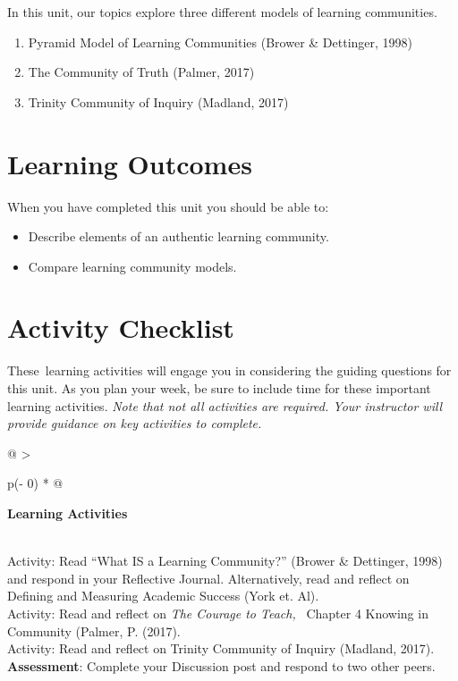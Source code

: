 \documentclass[
]{book}
\providecommand{\tightlist}{%
  \setlength{\itemsep}{0pt}\setlength{\parskip}{0pt}}
\begin{document}
In this unit, our topics explore three different models of learning communities.

\begin{enumerate}
\def\labelenumi{\arabic{enumi}.}
\tightlist
\item
  Pyramid Model of Learning Communities (Brower \& Dettinger, 1998)
\item
  The Community of Truth (Palmer, 2017)
\item
  Trinity Community of Inquiry (Madland, 2017)
\end{enumerate}

\hypertarget{learning-outcomes-3}{%
\section*{Learning Outcomes}\label{learning-outcomes-3}}

When you have completed this unit you should be able to:

\begin{itemize}
\tightlist
\item
  Describe elements of an authentic learning community.
\item
  Compare learning community models.
\end{itemize}

\hypertarget{activity-checklist-3}{%
\section*{Activity Checklist}\label{activity-checklist-3}}

These~learning activities will engage you in considering the guiding questions for this unit. As you plan your week, be sure to include time for these important learning activities. \emph{Note that not all activities are required. Your instructor will provide guidance on key activities to complete.}

\begin{longtable}[]{@{}
  >{\raggedright\arraybackslash}p{(\columnwidth - 0\tabcolsep) * }@{}}
\toprule
\begin{minipage}[b]{\linewidth}\raggedright
\textbf{Learning Activities}
\end{minipage} \\
\midrule
\endhead
Activity: Read ``What IS a Learning Community?'' (Brower \& Dettinger, 1998) and respond in your Reflective Journal. Alternatively, read and reflect on Defining and Measuring Academic Success (York et. Al). \\
Activity: Read and reflect on \emph{The Courage to Teach,} ~Chapter 4 Knowing in Community (Palmer, P. (2017). \\
Activity: Read and reflect on Trinity Community of Inquiry (Madland, 2017). \\
\textbf{Assessment}: Complete your Discussion post and respond to two other peers. \\
\bottomrule
\end{longtable}
\end{document}
